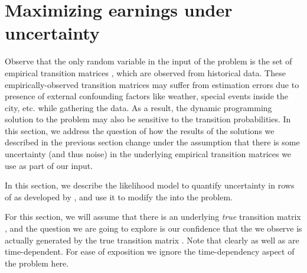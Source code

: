 

\section{Maximizing earnings under uncertainty}
\label{sec:sensitivity}
Observe that the only random variable in the input of the {\originalproblem} problem
is the set of empirical transition matrices {\empiricaltransitionmatrix}, which are 
observed from historical data. These empirically-observed transition matrices may suffer from estimation errors due to presence of external confounding factors like weather, special events inside the city, etc. while gathering the data. As a result, the dynamic programming solution to the {\originalproblem} problem
may also be sensitive to the transition probabilities. In this section, we
address the question of how the results of the solutions we described in the previous section change under the assumption that there is some uncertainty (and thus noise) in
the underlying empirical transition matrices we use as part of our input.

In this section, we describe the likelihood model to quantify uncertainty in rows of {\empiricaltransitionmatrix} as developed by \citet{nilim2004robustness}, and use it to modify the {\originalproblem} into the {\robustproblem} problem.



For this section, we will assume that there is an underlying \emph{true} transition matrix
{\truetransitionmatrix}, and the question we are going to explore is 
our confidence that the
{\countmatrix} we observe is actually 
generated by the true transition matrix {\truetransitionmatrix}. Note that
clearly {\truetransitionmatrix} as well as {\countmatrix} are time-dependent. For ease of
exposition we ignore the time-dependency aspect of the problem here.

